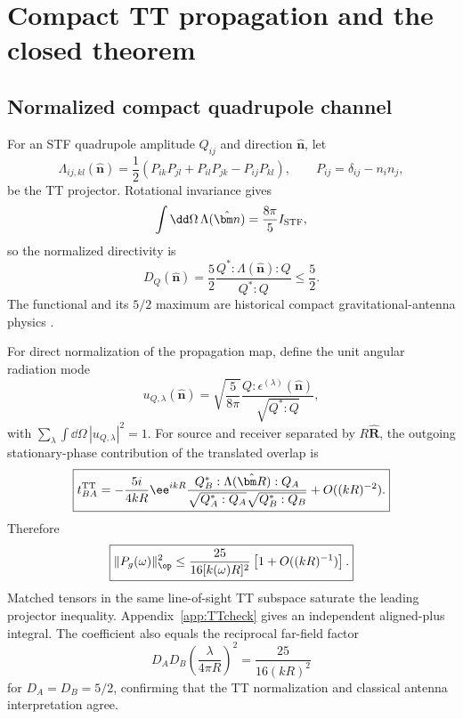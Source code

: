 \section{Compact TT propagation and the closed theorem}
\label{sec:ttcombined}

\subsection{Normalized compact quadrupole channel}

For an STF quadrupole amplitude $Q_{ij}$ and direction $\hat{\bm n}$, let
\begin{equation}
\Lambda_{ij,kl}(\hat{\bm n})
=\frac12(P_{ik}P_{jl}+P_{il}P_{jk}-P_{ij}P_{kl}),
\qquad P_{ij}=\delta_{ij}-n_in_j,
\label{eq:TTprojector}
\end{equation}
be the TT projector. Rotational invariance gives
\begin{equation}
\int\dd\Omega\,\Lambda(\hat{\bm n})
=\frac{8\pi}{5}I_{\rm STF},
\label{eq:LambdaIntegral}
\end{equation}
so the normalized directivity is
\begin{equation}
D_Q(\hat{\bm n})
=\frac52\frac{Q^*:\Lambda(\hat{\bm n}):Q}{Q^*:Q}
\le\frac52.
\label{eq:Dmax}
\end{equation}
The functional and its $5/2$ maximum are historical compact gravitational-antenna physics \cite{HirakawaNariharaFujimoto1976}.

For direct normalization of the propagation map, define the unit angular radiation mode
\begin{equation} u_{Q,\lambda}(\hat{\bm n})
=\sqrt{\frac5{8\pi}}
\frac{Q:\epsilon^{(\lambda)}(\hat{\bm n})}{\sqrt{Q^*:Q}},
\label{eq:normalizedmode}
\end{equation}
with $\sum_\lambda\int\dd\Omega\,|u_{Q,\lambda}|^2=1$. For source and receiver separated by $R\hat{\bm R}$, the outgoing stationary-phase contribution of the translated overlap is
\begin{equation}
\boxed{
t_{BA}^{\rm TT}
=-\frac{5i}{4kR}\ee^{ikR}
\frac{Q_B^*:\Lambda(\hat{\bm R}):Q_A}
{\sqrt{Q_A^*:Q_A}\sqrt{Q_B^*:Q_B}}
+O((kR)^{-2}).}
\label{eq:TTamplitude}
\end{equation}
Therefore
\begin{equation}
\boxed{
\|P_g(\omega)\|_{\op}^2
\le
\frac{25}{16[k(\omega)R]^2}
\left[1+O((kR)^{-1})\right].}
\label{eq:TTpropbound}
\end{equation}
Matched tensors in the same line-of-sight TT subspace saturate the leading projector inequality. Appendix~\ref{app:TTcheck} gives an independent aligned-plus integral. The coefficient also equals the reciprocal far-field factor
\begin{equation}
D_AD_B\left(\frac{\lambda}{4\pi R}\right)^2
=\frac{25}{16(kR)^2}
\label{eq:FriisTT}
\end{equation}
for $D_A=D_B=5/2$, confirming that the TT normalization and classical antenna interpretation agree.

